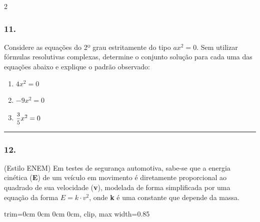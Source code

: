 \documentclass[twoside, 10pt, a4paper]{article}
\newlength{\espacoPreQuestao}\setlength{\espacoPreQuestao}{0.1cm}
\newlength{\espacoQuestao}\setlength{\espacoQuestao}{0.2cm}
\newcommand{\larguraTikz}{0.85\linewidth}
\begin{document}
\begin{multicols*}{2}
\subsubsection*{11.} Considere as equações do 2º grau estritamente do tipo $ ax^2 = 0 $. Sem utilizar fórmulas resolutivas complexas, determine o conjunto solução para cada uma das equações abaixo e explique o padrão observado:
\begin{enumerate}[label=\Alph*)]
    \item $ 4x^2 = 0 $
    \item $ -9x^2 = 0 $
    \item $ \mfrac{3}{5}x^2 = 0 $
\end{enumerate}
\par\vspace{\espacoQuestao}

\noindent\textcolor{CorLinha}{\rule{\linewidth}{0.5pt}} 
\par\vspace{\espacoPreQuestao}
\subsubsection*{12.} (Estilo ENEM) Em testes de segurança automotiva, sabe-se que a energia cinética (\textbf{E}) de um veículo em movimento é diretamente proporcional ao quadrado de sua velocidade (\textbf{v}), modelada de forma simplificada por uma equação da forma $ E = k \cdot v^2 $, onde \textbf{k} é uma constante que depende da massa.

\begin{center}
\begin{adjustbox}{trim=0cm 0cm 0cm 0cm, clip, max width=\larguraTikz}
\end{adjustbox}
\end{center}
\end{multicols*}
\end{document}
